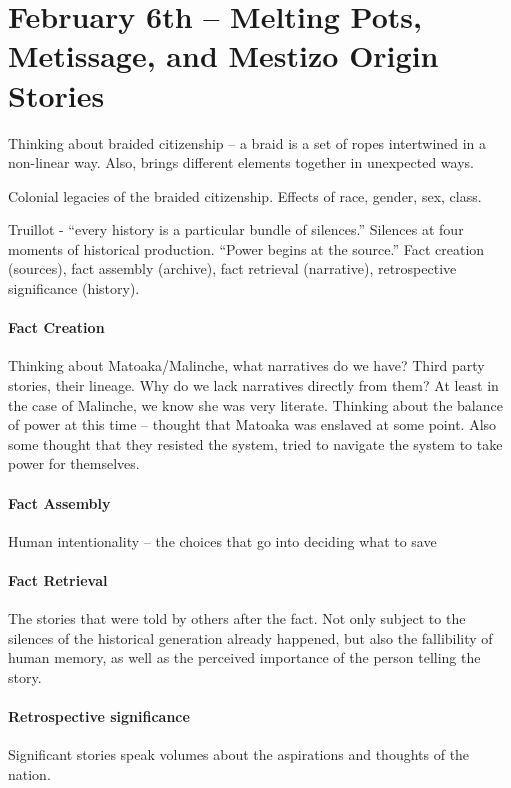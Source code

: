 \section{February 6th -- Melting Pots, Metissage, and Mestizo Origin Stories}

Thinking about braided citizenship -- a braid is a set of ropes intertwined in a non-linear way. Also, brings different elements together in unexpected ways.

Colonial legacies of the braided citizenship. Effects of race, gender, sex, class.

Truillot - ``every history is a particular bundle of silences.'' Silences at four moments of historical production. ``Power begins at the source.'' Fact creation (sources), fact assembly (archive), fact retrieval (narrative), retrospective significance (history).

\paragraph{Fact Creation} Thinking about Matoaka/Malinche, what narratives do we have? Third party stories, their lineage. Why do we lack narratives directly from them? At least in the case of Malinche, we know she was very literate. Thinking about the balance of power at this time -- thought that Matoaka was enslaved at some point. Also some thought that they resisted the system, tried to navigate the system to take power for themselves.

\paragraph{Fact Assembly} Human intentionality -- the choices that go into deciding what to save

\paragraph{Fact Retrieval} The stories that were told by others after the fact. Not only subject to the silences of the historical generation already happened, but also the fallibility of human memory, as well as the perceived importance of the person telling the story.

\paragraph{Retrospective significance} Significant stories speak volumes about the aspirations and thoughts of the nation.

